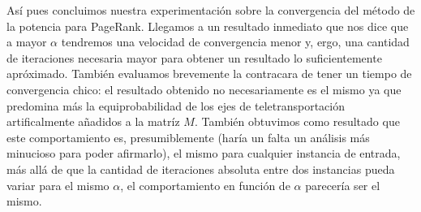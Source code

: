 \medskip
\par As\'i pues concluimos nuestra experimentaci\'on sobre la convergencia del
m\'etodo de la potencia para PageRank. Llegamos a un resultado inmediato que nos
dice que a mayor $\alpha$ tendremos una velocidad de convergencia menor y, ergo,
una cantidad de iteraciones necesaria mayor para obtener un resultado lo
suficientemente apr\'oximado. Tambi\'en evaluamos brevemente la contracara de
tener un tiempo de convergencia chico: el resultado obtenido no necesariamente
es el mismo ya que predomina m\'as la equiprobabilidad de los ejes de
teletransportaci\'on artificalmente a\~nadidos a la matr\'iz $M$. Tambi\'en
obtuvimos como resultado que este comportamiento es, presumiblemente (har\'ia un
falta un an\'alisis m\'as minucioso para poder afirmarlo), el mismo para
cualquier instancia de entrada, m\'as all\'a de que la cantidad de iteraciones
absoluta entre dos instancias pueda variar para el mismo $\alpha$, el
comportamiento en funci\'on de $\alpha$ parecer\'ia ser el mismo.
